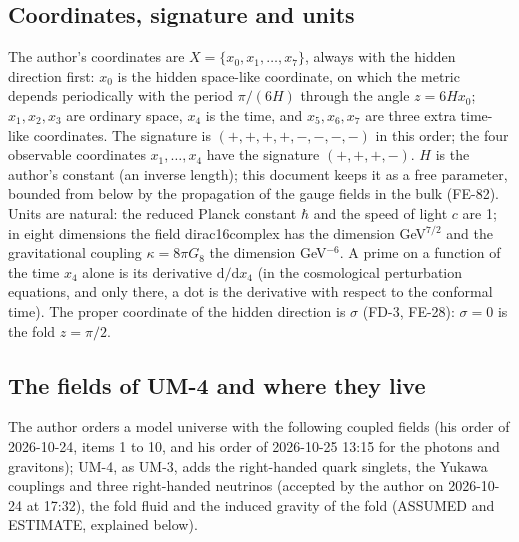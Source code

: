 \documentclass[
  10pt,
]{article}
\begin{document}
\hypertarget{coordinates-signature-and-units}{%
\subsection{Coordinates, signature and
units}\label{coordinates-signature-and-units}}

The author's coordinates are \(X = \{x_0, x_1, \dots, x_7\}\), always
with the hidden direction first: \(x_0\) is the hidden space-like
coordinate, on which the metric depends periodically with the period
\(\pi/(6H)\) through the angle \(z = 6Hx_0\); \(x_1, x_2, x_3\) are
ordinary space, \(x_4\) is the time, and \(x_5, x_6, x_7\) are three
extra time-like coordinates. The signature is \((+,+,+,+,-,-,-,-)\) in
this order; the four observable coordinates \(x_1, \dots, x_4\) have the
signature \((+,+,+,-)\). \(H\) is the author's constant (an inverse
length); this document keeps it as a free parameter, bounded from below
by the propagation of the gauge fields in the bulk (FE-82). Units are
natural: the reduced Planck constant \(\hbar\) and the speed of light
\(c\) are 1; in eight dimensions the field dirac16complex has the
dimension GeV\(^{7/2}\) and the gravitational coupling
\(\kappa = 8\pi G_8\) the dimension GeV\(^{-6}\). A prime on a function
of the time \(x_4\) alone is its derivative \(\mathrm{d}/\mathrm{d}x_4\)
(in the cosmological perturbation equations, and only there, a dot is
the derivative with respect to the conformal time). The proper
coordinate of the hidden direction is \(\sigma\) (FD-3, FE-28):
\(\sigma = 0\) is the fold \(z = \pi/2\).

\hypertarget{the-fields-of-um-4-and-where-they-live}{%
\subsection{The fields of UM-4 and where they
live}\label{the-fields-of-um-4-and-where-they-live}}

The author orders a model universe with the following coupled fields
(his order of 2026-10-24, items 1 to 10, and his order of 2026-10-25
13:15 for the photons and gravitons); UM-4, as UM-3, adds the
right-handed quark singlets, the Yukawa couplings and three right-handed
neutrinos (accepted by the author on 2026-10-24 at 17:32), the fold
fluid and the induced gravity of the fold (ASSUMED and ESTIMATE,
explained below).
\end{document}

